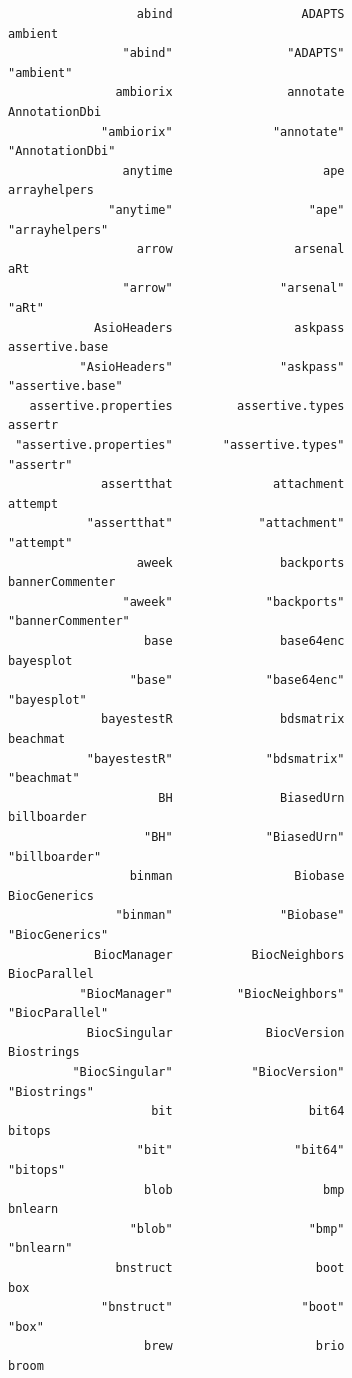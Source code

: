 \documentclass[
  letterpaper,
  DIV=11,
  numbers=noendperiod]{scrreprt}
\begin{document}
\begin{verbatim}
                  abind                  ADAPTS                 ambient 
                "abind"                "ADAPTS"               "ambient" 
               ambiorix                annotate           AnnotationDbi 
             "ambiorix"              "annotate"         "AnnotationDbi" 
                anytime                     ape            arrayhelpers 
              "anytime"                   "ape"          "arrayhelpers" 
                  arrow                 arsenal                     aRt 
                "arrow"               "arsenal"                   "aRt" 
            AsioHeaders                 askpass          assertive.base 
          "AsioHeaders"               "askpass"        "assertive.base" 
   assertive.properties         assertive.types                 assertr 
 "assertive.properties"       "assertive.types"               "assertr" 
             assertthat              attachment                 attempt 
           "assertthat"            "attachment"               "attempt" 
                  aweek               backports         bannerCommenter 
                "aweek"             "backports"       "bannerCommenter" 
                   base               base64enc               bayesplot 
                 "base"             "base64enc"             "bayesplot" 
             bayestestR               bdsmatrix                beachmat 
           "bayestestR"             "bdsmatrix"              "beachmat" 
                     BH               BiasedUrn             billboarder 
                   "BH"             "BiasedUrn"           "billboarder" 
                 binman                 Biobase            BiocGenerics 
               "binman"               "Biobase"          "BiocGenerics" 
            BiocManager           BiocNeighbors            BiocParallel 
          "BiocManager"         "BiocNeighbors"          "BiocParallel" 
           BiocSingular             BiocVersion              Biostrings 
         "BiocSingular"           "BiocVersion"            "Biostrings" 
                    bit                   bit64                  bitops 
                  "bit"                 "bit64"                "bitops" 
                   blob                     bmp                 bnlearn 
                 "blob"                   "bmp"               "bnlearn" 
               bnstruct                    boot                     box 
             "bnstruct"                  "boot"                   "box" 
                   brew                    brio                   broom 

\end{verbatim}
\end{document}
